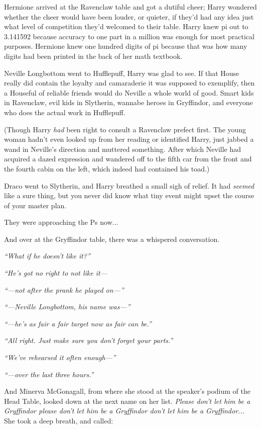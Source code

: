 Hermione arrived at the Ravenclaw table and got a dutiful cheer; Harry wondered whether the cheer would have been louder, or quieter, if they’d had any idea just what level of competition they’d welcomed to their table. Harry knew pi out to 3.141592 because accuracy to one part in a million was enough for most practical purposes. Hermione knew one hundred digits of pi because that was how many digits had been printed in the back of her math textbook.

Neville Longbottom went to Hufflepuff, Harry was glad to see. If that House really did contain the loyalty and camaraderie it was supposed to exemplify, then a Houseful of reliable friends would do Neville a whole world of good. Smart kids in Ravenclaw, evil kids in Slytherin, wannabe heroes in Gryffindor, and everyone who does the actual work in Hufflepuff.

(Though Harry \emph{had} been right to consult a Ravenclaw prefect first. The young woman hadn’t even looked up from her reading or identified Harry, just jabbed a wand in Neville’s direction and muttered something. After which Neville had acquired a dazed expression and wandered off to the fifth car from the front and the fourth cabin on the left, which indeed had contained his toad.)

Draco went to Slytherin, and Harry breathed a small sigh of relief. It had \emph{seemed} like a sure thing, but you never did know what tiny event might upset the course of your master plan.

They were approaching the Ps now...

And over at the Gryffindor table, there was a whispered conversation.

\emph{“What if he doesn’t like it?”}

\emph{“He’s got no right to not like it—}

\emph{“—not after the prank he played on—”}

\emph{“—Neville Longbottom, his name was—”}

\emph{“—he’s as fair a fair target now as fair can be.”}

\emph{“All right. Just make sure you don’t forget your parts.”}

\emph{“We’ve rehearsed it often enough—”}

\emph{“—over the last three hours.”}

And Minerva McGonagall, from where she stood at the speaker’s podium of the Head Table, looked down at the next name on her list. \emph{Please don’t let him be a Gryffindor please don’t let him be a Gryffindor  don’t let him be a Gryffindor...} She took a deep breath, and called:

